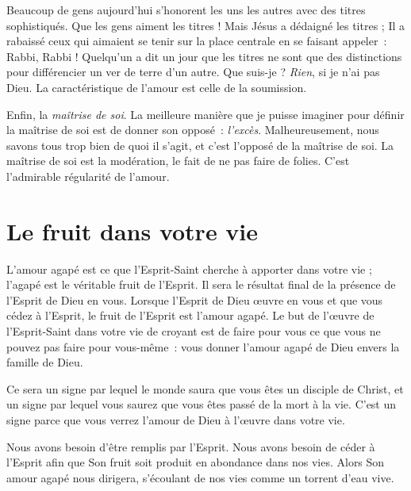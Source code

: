 Beaucoup de gens aujourd'hui s'honorent les uns les autres
 avec des titres sophistiqués. Que les gens aiment les titres !
 Mais Jésus a dédaigné les titres ; Il a rabaissé ceux qui aimaient
 se tenir sur la place centrale en se faisant appeler~:
 \og Rabbi, Rabbi ! \fg{}
 Quelqu'un a dit un jour que les titres ne sont que des distinctions
 pour différencier un ver de terre d'un autre. Que suis-je ?
 \emph{Rien}, si je n'ai pas Dieu. La caractéristique de l'amour
 est celle de la soumission.

Enfin, la \emph{maîtrise de soi}. La meilleure manière que je puisse imaginer
 pour définir la maîtrise de soi est de donner son opposé~: \emph{l'excès}.
 Malheureusement, nous savons tous trop bien de quoi il s'agit,
 et c'est l'opposé de la maîtrise de soi.
 La maîtrise de soi est la modération, le fait de ne pas faire de folies.
 C'est l'admirable régularité de l'amour.


\section*{Le fruit dans votre vie}

L'amour agapé est ce que l'Esprit-Saint cherche à apporter dans votre vie ;
 l'agapé est le véritable fruit de l'Esprit.
 Il sera le résultat final de la présence de l'Esprit de Dieu en vous.
 Lorsque l'Esprit de Dieu œuvre en vous et que vous cédez à l'Esprit,
 le fruit de l'Esprit est l'amour agapé. Le but de l'œuvre de
 l'Esprit-Saint dans votre vie de croyant est de faire pour vous
 ce que vous ne pouvez pas faire pour vous-même~:
 vous donner l'amour agapé de Dieu envers la famille de Dieu.

Ce sera un signe par lequel le monde saura que vous êtes un disciple
 de Christ, et un signe par lequel vous saurez que vous êtes passé
 de la mort à la vie. C'est un signe parce que vous verrez
 l'amour de Dieu à l'œuvre dans votre vie.

Nous avons besoin d'être remplis par l'Esprit.
 Nous avons besoin de céder à l'Esprit afin que Son fruit soit produit
 en abondance dans nos vies. Alors Son amour agapé nous dirigera,
 s'écoulant de nos vies comme un torrent d'eau vive.
\closechapter

